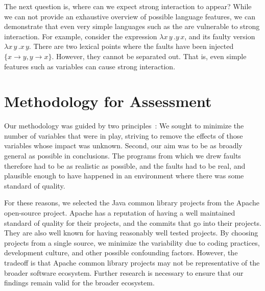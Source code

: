 \documentclass[preprint,nonatbib]{sigplanconf}\usepackage[]{graphicx}\usepackage[]{color}
\begin{document}
The next question is, where can we expect strong interaction to appear?
While we can not provide an exhaustive overview of possible language features,
we can demonstrate that even very simple languages such as the \lcalc are vulnerable
to strong interaction. For example, consider the \lcalc expression $\lambda x\,y\,. y\,x$,
and its faulty version $\lambda x\,y\,. x\,y$. There are two lexical points where
the faults have been injected $\{x \rightarrow y, y \rightarrow x\} $. However,
they cannot be separated out. That is, even simple features such as variables
can cause strong interaction.



\section{Methodology for Assessment}
\label{sec:methodology}

Our methodology was guided by two principles~\cite{siegmund2015views}:
We sought to minimize the number of variables that were in play, striving to
remove the effects of those variables whose impact was unknown.
Second, our aim was to be as broadly general as possible in
conclusions.  The programs from which we drew faults therefore had to be as realistic
as possible, and the faults had to be real, and plausible enough
to have happened in an environment where there was some standard of quality.

For these reasons, we selected the Java common library projects from
the Apache open-source project. Apache has a reputation of having a well maintained
standard of quality for their projects, and the commits that go into their
projects. They are also well known for having reasonably well tested projects.
By choosing projects from a single source, we minimize the variability due
to coding practices, development culture, and other possible confounding
factors. However, the tradeoff is that Apache common library projects may not
be representative of the broader software ecosystem. Further research is
necessary to ensure that our findings remain valid for the broader ecosystem.
\end{document}
